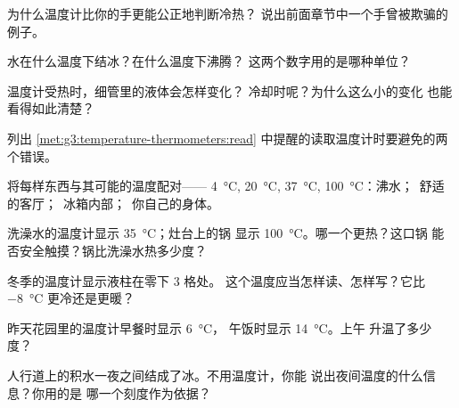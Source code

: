 \begin{exercise}[$\star$]\label{exo:g3:temperature-thermometers:1}
为什么温度计比你的手更能公正地判断冷热？
说出前面章节中一个手曾被欺骗的例子。
\end{exercise}

\begin{exercise}[$\star$]\label{exo:g3:temperature-thermometers:2}
水在什么温度下结冰？在什么温度下沸腾？
这两个数字用的是哪种单位？
\end{exercise}

\begin{exercise}[$\star$]\label{exo:g3:temperature-thermometers:3}
温度计受热时，细管里的液体会怎样变化？
冷却时呢？为什么这么小的变化
也能看得如此清楚？
\end{exercise}

\begin{exercise}[$\star$]\label{exo:g3:temperature-thermometers:4}
列出 \cref{met:g3:temperature-thermometers:read}
中提醒的读取温度计时要避免的两个错误。
\end{exercise}

\begin{exercise}[$\star$]\label{exo:g3:temperature-thermometers:5}
将每样东西与其可能的温度配对——
\qty{4}{\celsius}, \qty{20}{\celsius}, \qty{37}{\celsius},
\qty{100}{\celsius}：沸水；\ 舒适的客厅；\ 
冰箱内部；\ 你自己的身体。
\end{exercise}

\begin{exercise}[$\star$]\label{exo:g3:temperature-thermometers:6}
洗澡水的温度计显示 \qty{35}{\celsius}；灶台上的锅
显示 \qty{100}{\celsius}。哪一个更热？这口锅
能否安全触摸？锅比洗澡水热多少度？
\end{exercise}

\begin{exercise}[$\star$]\label{exo:g3:temperature-thermometers:7}
冬季的温度计显示液柱在零下 $3$ 格处。
这个温度应当怎样读、怎样写？它比
\qty{-8}{\celsius} 更冷还是更暖？
\end{exercise}

\begin{exercise}[$\star$]\label{exo:g3:temperature-thermometers:8}
昨天花园里的温度计早餐时显示 \qty{6}{\celsius}，
午饭时显示 \qty{14}{\celsius}。上午
升温了多少度？
\end{exercise}

\begin{exercise}[$\star$]\label{exo:g3:temperature-thermometers:9}
人行道上的积水一夜之间结成了冰。不用温度计，你能
说出夜间温度的什么信息？你用的是
哪一个刻度作为依据？
\end{exercise}

